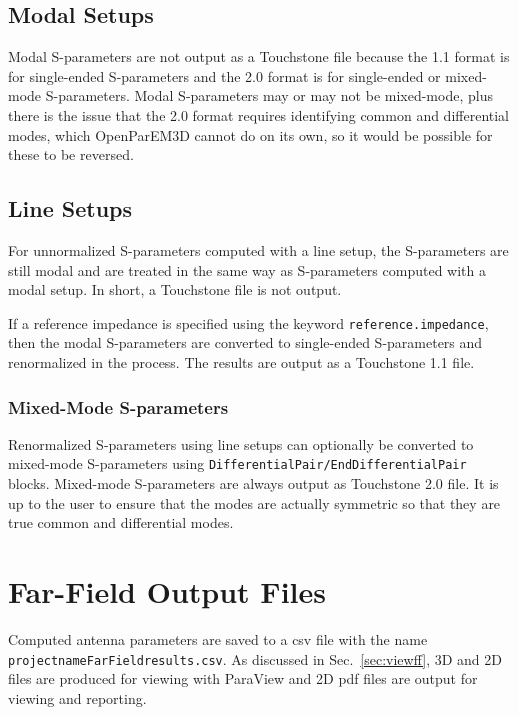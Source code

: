 \documentclass[titlepage]{article}
\renewcommand\_{\textunderscore\linebreak[1]}
\begin{document}
\subsection{Modal Setups}

Modal S-parameters are not output as a Touchstone file because the 1.1 format is for single-ended S-parameters and the 2.0 format is for single-ended or mixed-mode S-parameters.  Modal S-parameters may or may not be mixed-mode, plus there is the issue that the 2.0 format requires identifying common and differential modes, which OpenParEM3D cannot do on its own, so it would be possible for these to be reversed. 

\subsection{Line Setups}

For unnormalized S-parameters computed with a line setup, the S-parameters are still modal and are treated in the same way as S-parameters computed with a modal setup.  In short, a Touchstone file is not output.

If a reference impedance is specified using the keyword \texttt{reference.impedance}, then the modal S-parameters are converted to single-ended S-parameters and renormalized in the process.  The results are output as a Touchstone 1.1 file.

\subsubsection{Mixed-Mode S-parameters}

Renormalized S-parameters using line setups can optionally be converted to mixed-mode S-parameters using \texttt{DifferentialPair/EndDifferentialPair} blocks.
Mixed-mode S-parameters are always output as Touchstone 2.0 file.  It is up to the user to ensure that the modes are actually symmetric so that they are true common and differential modes.  

\section{Far-Field Output Files}
\label{sec:FarFieldoutput}

Computed antenna parameters are saved to a csv file with the name \texttt{projectname\_FarField\_results.csv}. As discussed in Sec.~\ref{sec:viewff}, 3D and 2D files are produced for viewing with ParaView and 2D pdf files are output for viewing and reporting.
\end{document}
